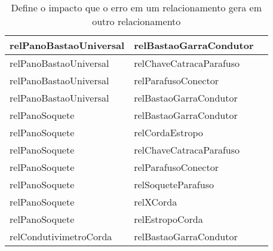 \begin{table}[H]
\begin{tabular}{|l|l|l|}
relPanoBastaoUniversal                          & relBastaoGarraCondutor                           \\ \hline
relPanoBastaoUniversal                          & relChaveCatracaParafuso                          \\ \hline
relPanoBastaoUniversal                          & relParafusoConector                              \\ \hline
relPanoBastaoUniversal                          & relBastaoGarraCondutor                           \\ \hline
relPanoSoquete                                  & relBastaoGarraCondutor                           \\ \hline
relPanoSoquete                                  & relCordaEstropo                                  \\ \hline
relPanoSoquete                                  & relChaveCatracaParafuso                          \\ \hline
relPanoSoquete                                  & relParafusoConector                              \\ \hline
relPanoSoquete                                  & relSoqueteParafuso                               \\ \hline
relPanoSoquete                                  & relXCorda                                        \\ \hline
relPanoSoquete                                  & relEstropoCorda                                  \\ \hline
relCondutivimetroCorda                          & relBastaoGarraCondutor                           \\ \hline
\end{tabular}
\caption{Define o impacto que o erro em um relacionamento gera em outro relacionamento}
\label{relation2}
\end{table}

